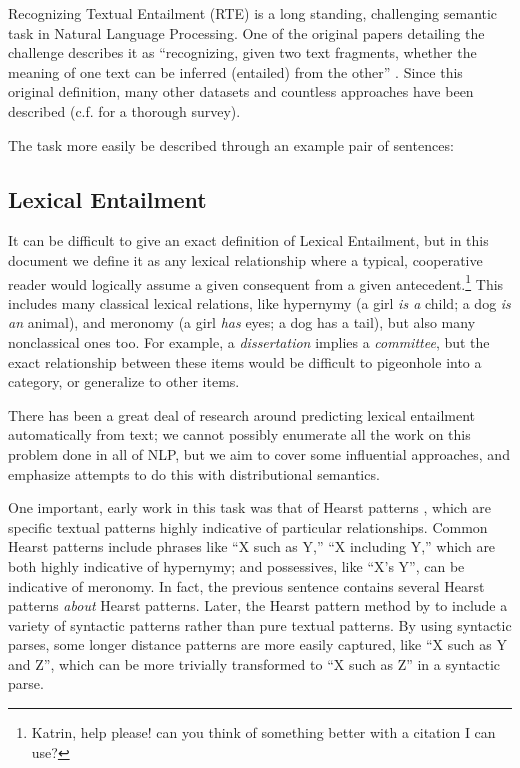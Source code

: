 \documentclass[12pt]{article}
\begin{document}
Recognizing Textual Entailment (RTE) is a long standing, challenging semantic
task in Natural Language Processing. One of the original papers detailing the
challenge describes it as ``recognizing, given two text fragments, whether the
meaning of one text can be inferred (entailed) from the other''
\cite{dagan:2006:mlc}. Since this original definition, many other datasets
\cite{giampiccolo:2007:pascal,bentivogli:2009:tac,marelli:2014:semeval} and
countless approaches have been described (c.f. 
for a thorough survey).

The task more easily be described through an example pair of sentences:


\subsection{Lexical Entailment}

It can be difficult to give an exact definition of Lexical Entailment, but in
this document we define it as any lexical relationship where a typical,
cooperative reader would logically assume a given consequent from a given
antecedent.\footnote{Katrin, help please!  can you think of something better
with a citation I can use?} This includes many classical lexical relations,
like hypernymy (a girl {\em is a} child; a dog {\em is an} animal), and
meronomy (a girl {\em has} eyes; a dog {has a} tail), but also many
nonclassical ones too. For example, a {\em dissertation} implies a {\em
committee}, but the exact relationship between these items would be difficult
to pigeonhole into a category, or generalize to other items.

There has been a great deal of research around predicting lexical entailment
automatically from text; we cannot possibly enumerate all the work on this
problem done in all of NLP, but we aim to cover some influential approaches,
and emphasize attempts to do this with distributional semantics.

One important, early work in this task was that of Hearst patterns
\cite{hearst:1992:coling}, which are specific textual patterns highly
indicative of particular relationships. Common Hearst patterns include
phrases like ``X such as Y,'' ``X including Y,'' which are both highly
indicative of hypernymy; and possessives, like ``X's Y'', can be indicative
of meronomy. In fact, the previous sentence contains several Hearst patterns
{\em about} Hearst patterns. Later, the Hearst pattern method by
 to include a variety of syntactic patterns rather than
pure textual patterns. By using syntactic parses, some longer distance patterns
are more easily captured, like ``X such as Y and Z'', which can be more
trivially transformed to ``X such as Z'' in a syntactic parse.
\end{document}
